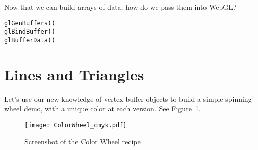 Now that we can build arrays of data, how do we pass them into WebGL?

\begin{lstlisting}
glGenBuffers()
glBindBuffer()
glBufferData()
\end{lstlisting}



\section{Lines and Triangles}


Let's use our new knowledge of vertex buffer objects to build a simple spinning-wheel demo, with a unique color at each version.  See Figure~\ref{fig:ColorWheel}.

\begin{figure}[htb]\centering
  \texttt{[image: ColorWheel\_cmyk.pdf]}
  \caption{Screenshot of the Color Wheel recipe}
  \label{fig:ColorWheel}
\end{figure}
